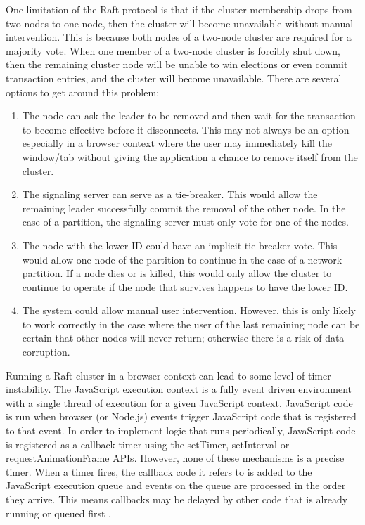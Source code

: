 \documentclass[conference,compsoc]{./IEEEtran/IEEEtran}
\begin{document}
One limitation of the Raft protocol is that if the cluster membership drops from
two nodes to one node, then the cluster will become unavailable without manual
intervention. This is because both nodes of a two-node cluster are required for
a majority vote.  When one member of a two-node cluster is forcibly shut down,
then the remaining cluster node will be unable to win elections or even commit
transaction entries, and the cluster will become unavailable. There are several
options to get around this problem:


\begin{enumerate}
\item The node can ask the leader to be removed and then wait for the
  transaction to become effective before it disconnects.  This may not
  always be an option especially in a browser context where the user
  may immediately kill the window/tab without giving the application
  a chance to remove itself from the cluster.
\item The signaling server can serve as a tie-breaker. This would allow
  the remaining leader successfully commit the removal of the other
  node. In the case of a partition, the signaling server must only
  vote for one of the nodes.
\item The node with the lower ID could have an implicit tie-breaker vote.
  This would allow one node of the partition to continue in the case
  of a network partition. If a node dies or is killed, this would only
  allow the cluster to continue to operate if the node that survives
  happens to have the lower ID.
\item The system could allow manual user intervention. However, this is
  only likely to work correctly in the case where the user of the last
  remaining node can be certain that other nodes will never return;
  otherwise there is a risk of data-corruption.
\end{enumerate}

Running a Raft cluster in a browser context can lead to some level of
timer instability. The JavaScript execution context is a fully event
driven environment with a single thread of execution for a given
JavaScript context. JavaScript code is run when browser (or Node.js)
events trigger JavaScript code that is registered to that event. In
order to implement logic that runs periodically, JavaScript code is
registered as a callback timer using the setTimer, setInterval or
requestAnimationFrame APIs. However, none of these mechanisms is
a precise timer. When a timer fires, the callback code it refers to
is added to the JavaScript execution queue and events on the queue are
processed in the order they arrive. This means callbacks may be
delayed by other code that is already running or queued first
\cite{resig2013secrets}.
\end{document}
